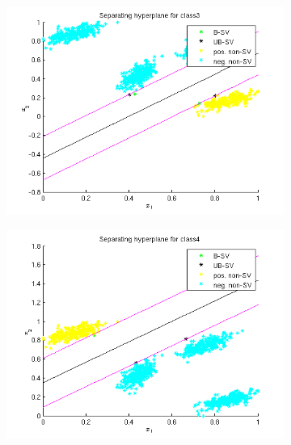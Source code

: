 \documentclass{article}
\begin{document}
\begin{figure}
\begin{subfigure}{.5\textwidth}
  \centering
  \includegraphics[width=.8\linewidth]{Classification/1a/c_linear/hc3}
 
\end{subfigure}%
\begin{subfigure}{.5\textwidth}
  \centering
  \includegraphics[width=.8\linewidth]{Classification/1a/c_linear/hc4}
  
\end{subfigure}
\end{figure}
\end{document}
